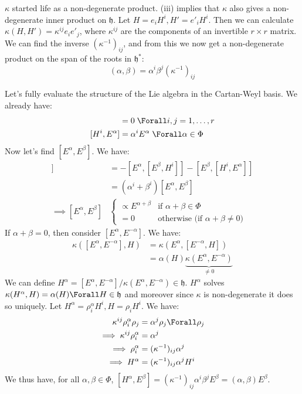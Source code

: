 \documentclass{jknotes}
\begin{document}
\(\kappa\) started life as a non-degenerate product. (iii) implies that \(\kappa\) also gives a non-degenerate inner product on \(\mathfrak{h}\). Let \(H = e_iH^i, H' = e'_i H^i\). Then we can calculate \(\kappa(H,H') = \kappa^{ij}e_ie'_j\), where \(\kappa^{ij}\) are the components of an invertible \(r\times r\) matrix. We can find the inverse \((\kappa^{-1})_{ij}\), and from this we now get a non-degenerate product on the span of the roots in \(\mathfrak{h}^*\):
\begin{equation}
    (\alpha,\beta) = \alpha^i\beta^j(\kappa^{-1})_{ij}
\end{equation}

Let's fully evaluate the structure of the Lie algebra in the Cartan-Weyl basis. We already have:
\begin{align}
    [H^i,H^j]&=0 \; \Forall i,j = 1,\dots,r \\
    [H^i,E^\alpha] &= \alpha^iE^\alpha \; \Forall \alpha \in \Phi
\end{align}
Now let's find \([E^\alpha,E^\beta]\). We have:
\begin{align}
    [H^i,[E^\alpha,E^\beta]] &= -[E^\alpha,[E^\beta,H^i]] -[E^\beta,[H^i,E^\alpha]] \\
    &= (\alpha^i+\beta^i)[E^\alpha,E^\beta]\\
    \implies [E^\alpha,E^\beta] &
    \begin{cases}
        \propto E^{\alpha+\beta} & \text{if } \alpha+\beta\in\Phi \\
        = 0 & \text{otherwise (if } \alpha + \beta \ne 0\text{)}
    \end{cases}
\end{align}
If \(\alpha+\beta = 0\), then consider \([E^\alpha,E^{-\alpha}]\). We have:
\begin{align}
    \kappa([E^\alpha,E^{-\alpha}],H) &= \kappa(E^\alpha,[E^{-\alpha},H]) \\
    &= \alpha(H) \underbrace{\kappa(E^\alpha,E^{-\alpha})}_{\ne 0}
\end{align}
We can define \(H^\alpha = [E^\alpha,E^{-\alpha}]/\kappa(E^\alpha,E^{-\alpha}) \in \mathfrak{h}\). \(H^\alpha\) solves \(\kappa(H^\alpha,H) = \alpha(H) \Forall H \in \mathfrak{h}\) and moreover since \(\kappa\) is non-degenerate it does so uniquely. Let \(H^\alpha=\rho_i^\alpha H^i, H = \rho_i H^i\). We have:
\begin{align}
    \kappa^{ij} \rho_i^\alpha\rho_j &= \alpha^j \rho_j \Forall \rho_j \\
    \implies \kappa^{ij}\rho_i^\alpha &= \alpha^j \\
    \implies \rho_i^\alpha &= (\kappa^{-1})_{ij}\alpha^j \\
    \implies H^\alpha &= (\kappa^{-1})_{ij} \alpha^jH^i
\end{align}
We thus have, for all \(\alpha,\beta\in\Phi\), \([H^\alpha,E^\beta]=(\kappa^{-1})_{ij}\alpha^i\beta^jE^\beta=(\alpha,\beta)E^\beta\). 
\end{document}
